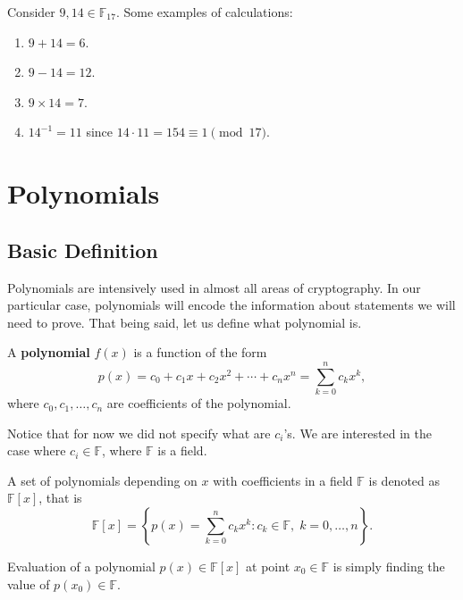 \documentclass[../lecture-notes.tex]{subfiles}
\begin{document}
\begin{example}
    Consider $9, 14 \in \mathbb{F}_{17}$. Some examples of calculations:
    \begin{enumerate}
        \item $9+14 = 6$.
        \item $9-14 = 12$.
        \item $9 \times 14 = 7$.
        \item $14^{-1} = 11$ since $14 \cdot 11 = 154 \equiv 1 \pmod{17}$.
    \end{enumerate}
\end{example}


\section{Polynomials}\label{section:polynomials}

\subsection{Basic Definition}

Polynomials are intensively used in almost all areas of cryptography. In our particular case, polynomials will encode the information about
statements we will need to prove. That being said, let us define what polynomial is.

\begin{definition}
    A \textbf{polynomial} $f(x)$ is a function of the form
    \begin{equation}
        p(x) = c_0 + c_1 x + c_2 x^2 + \cdots + c_n x^n = \sum_{k=0}^{n} c_k x^k,
    \end{equation}
    where $c_0, c_1, \dots, c_n$ are coefficients of the polynomial.
\end{definition}

Notice that for now we did not specify what are $c_i$'s. We are interested in the case where $c_i \in \mathbb{F}$, where $\mathbb{F}$ is a field. 

\begin{definition}
    A set of polynomials depending on $x$ with coefficients in a field $\mathbb{F}$ is denoted as $\mathbb{F}[x]$, that is
    \begin{equation}
        \mathbb{F}[x] = \left\{p(x) = \sum_{k=0}^{n} c_k x^k: c_k \in \mathbb{F}, \; k = 0,\dots,n\right\}.
    \end{equation}
\end{definition}

\begin{definition}
    Evaluation of a polynomial $p(x) \in \mathbb{F}[x]$ at point $x_0 \in \mathbb{F}$ is simply finding the value of $p(x_0) \in \mathbb{F}$.
\end{definition}
\end{document}
